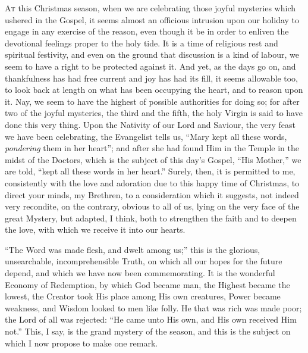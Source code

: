 A\textsc{t} this Christmas season, when we are celebrating
those joyful mysteries which ushered in the Gospel, it
seems almost an officious intrusion upon our holiday to
engage in any exercise of the reason, even though it be
in order to enliven the devotional feelings proper to the
holy tide. It is a time of religious rest and spiritual
festivity, and even on the ground that discussion is a
kind of labour, we seem to have a right to be protected
against it. And yet, as the days go on, and thankfulness
has had free current and joy has had its fill, it seems
allowable too, to look back at length on what has been
occupying the heart, and to reason upon it. Nay, we seem
to have the highest of possible authorities for doing so;
for after two of the joyful mysteries, the third and the
fifth, the holy Virgin is said to have done this very
thing. Upon the Nativity of our Lord and Saviour, the
very feast we have been celebrating, the Evangelist tells
us, ``Mary kept all these words, \emph{pondering}
them in her heart''; and after she had found Him in
the Temple in the midst of the Doctors, which is the
subject of this day's Gospel, ``His Mother,'' we
are told, ``kept all these words in her heart.''
Surely, then, it is permitted to me, consistently with
the love and adoration due to this happy time of
Christmas, to direct your minds, my Brethren, to a
consideration which it suggests, not indeed very
recondite, on the contrary, obvious to all of us, lying
on the very face of the great Mystery, but adapted, I
think, both to strengthen the faith and to deepen the
love, with which we receive it into our hearts.

``The Word was made flesh, and dwelt among us;''
this is the glorious, unsearchable, incomprehensible
Truth, on which all our hopes for the future depend, and
which we have now been commemorating. It is the wonderful
Economy of Redemption, by which God became man, the
Highest became the lowest, the Creator took His place
among His own creatures, Power became weakness, and
Wisdom looked to men like folly. He that was rich was
made poor; the Lord of all was rejected: ``He came
unto His own, and His own received Him not.'' This, I
say, is the grand mystery of the season, and this is the
subject on which I now propose to make one remark.

